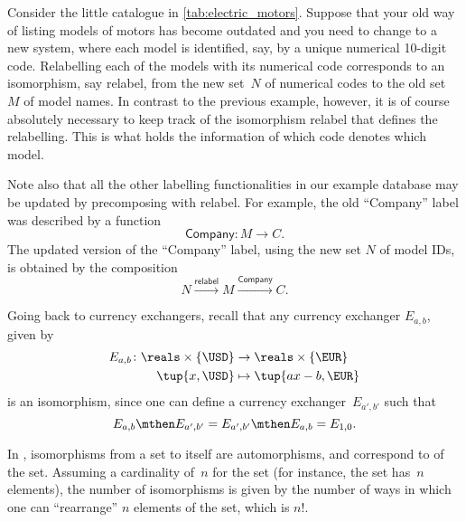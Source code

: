 \begin{example}[Relabelling]
Consider the little catalogue in \cref{tab:electric_motors}. Suppose that your old way of listing models of motors has become outdated and you need to change to a new system, where each model is identified, say, by a unique numerical 10-digit code. Relabelling each of the models with its numerical code corresponds to an isomorphism, say \textsf{relabel}, from the new set~$N$ of numerical codes to the old set~$M$ of model names. In contrast to the previous example, however, it is of course absolutely necessary to keep track of the isomorphism \textsf{relabel} that defines the relabelling. This is what holds the information of which code denotes which model.

Note also that all the other labelling functionalities in our example database may be updated by precomposing with \textsf{relabel}. For example, the old ``Company'' label was described by a function
\begin{equation*}
\textsf{Company}\colon M \to C.
\end{equation*}
The updated version of the ``Company'' label, using the new set $N$ of model IDs, is obtained by the composition
\begin{equation*}
N \overset{\textsf{relabel}}{\longrightarrow} M \overset{\textsf{Company}}{\longrightarrow} C.
\end{equation*}
\end{example}

\begin{example}
Going back to currency exchangers, recall that any currency exchanger $E_{a,b}$, given by
\begin{equation*}
\begin{aligned}
E_{a,b}\colon \reals\times \{\USD\}&\to \reals\times \{\EUR\}\\
\tup{x,\USD}&\mapsto \tup{ax-b,\EUR}
\end{aligned}
\end{equation*}
is an isomorphism, since one can define a currency exchanger~$E_{a',b'}$ such that
\begin{equation*}
E_{a,b}\mthen E_{a',b'}=E_{a',b'}\mthen E_{a,b}=E_{1,0}.
\end{equation*}
\end{example}


\begin{example}
In \FinSet, isomorphisms from a set to itself are automorphisms, and correspond to \emph{} of the set. Assuming a cardinality of~$n$ for the set (for instance, the set has~$n$ elements), the number of isomorphisms is given by the number of ways in which one can ``rearrange'' $n$ elements of the set, which is $n!$.
\end{example}

